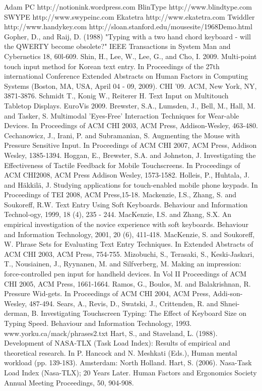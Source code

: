 \documentclass{chi2011}
\begin{document}

\begin{thebibliography}{1}
 Adam PC http://notionink.wordpress.com
 BlinType http://www.blindtype.com
 SWYPE http://www.swypeinc.com
 Ekatetra http://www.ekatetra.com
 Twiddler http://www.handykey.com
 http://sloan.stanford.edu/mousesite/1968Demo.html
 Gopher, D., and Raij, D. (1988) "Typing with a two hand chord keyboard - will the QWERTY become obsolete?" IEEE Transactions in System Man and Cybernetics 18, 60l-609. 
 Shin, H., Lee, W., Lee, G., and Cho, I. 2009. Multi-point touch input method for Korean text entry. In Proceedings of the 27th international Conference Extended Abstracts on Human Factors in Computing Systems (Boston, MA, USA, April 04 - 09, 2009). CHI '09. ACM, New York, NY, 3871-3876.
 Schmidt T., Konig W., Reiterer H. Text Input on Multitouch Tabletop Displays. EuroVis 2009.
 Brewster, S.A., Lumsden, J., Bell, M., Hall, M. and Tasker, S. Multimodal 'Eyes-Free' Interaction Techniques for Wear-able Devices. In Proceedings of ACM CHI 2003, ACM Press, Addison-Wesley, 463-480.
 Cechanowicz, J., Irani, P. and Subramanian, S. Augmenting the Mouse with Pressure Sensitive Input. In Proceedings of ACM CHI 2007, ACM Press, Addison Wesley, 1385-1394.
 Hoggan, E., Brewster, S.A. and Johnston, J. Investigating the Effectiveness of Tactile Feedback for Mobile Touchscreens. In Proceedings of ACM CHI2008, ACM Press Addison Wesley, 1573-1582.
 Holleis, P., Huhtala, J. and Häkkilä, J. Studying applications for touch-enabled mobile phone keypads. In Proceedings of TEI 2008, ACM Press,15-18.
 Mackenzie, I.S., Zhang, S. and Soukoreff, R.W. Text Entry Using Soft Keyboards. Behaviour and Information Technol-ogy, 1999, 18 (4), 235 - 244.
 MacKenzie, I.S. and Zhang, S.X. An empirical investigation of the novice experience with soft keyboards. Behaviour and Information Technology, 2001, 20 (6), 411-418.
 MacKenzie, S. and Soukoreff, W. Phrase Sets for Evaluating Text Entry Techniques. In Extended Abstracts of ACM CHI 2003, ACM Press, 754-755.
 Mizobuchi, S., Terasaki, S., Keski-Jaskari, T., Nousiainen, J., Ryynanen, M. and Silfverberg, M. Making an impression: force-controlled pen input for handheld devices. In Vol II Proceedings of ACM CHI 2005, ACM Press, 1661-1664.
 Ramos, G., Boulos, M. and Balakrishnan, R. Pressure Wid-gets. In Proceedings of ACM CHI 2004, ACM Press, Addi-son-Wesley, 487-494.
 Sears, A., Revis, D., Swatski, J., Crittenden, R. and Shnei-derman, B. Investigating Touchscreen Typing: The Effect of Keyboard Size on Typing Speed. Behaviour and Information Technology, 1993.
 www.yorku.ca/mack/phrases2.txt
 Hart, S., and Staveland, L. (1988). Development of NASA-TLX (Task Load Index): Results of empirical and theoretical research. In P. Hancock and N. Meshkati (Eds.), Human mental workload (pp. 139-183). Amsterdam: North Holland.
 Hart, S. (2006). Nasa-Task Load Index (Nasa-TLX); 20 Years Later. Human Factors and Ergonomics Society Annual Meeting Proceedings, 50, 904-908.
\end{thebibliography}
\end{document}
